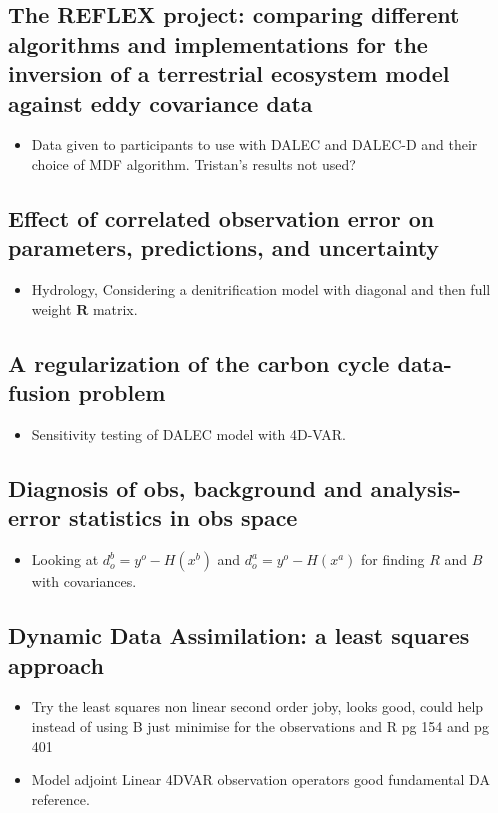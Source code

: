 \documentclass[11pt]{article}
\begin{document}
\subsection*{The REFLEX project: comparing different algorithms and implementations for the inversion of a terrestrial ecosystem model against eddy covariance data \cite{fox2009reflex}}
\begin{itemize}
\item Data given to participants to use with DALEC and DALEC-D and their choice of MDF algorithm. Tristan's results not used?
\end{itemize}


\subsection*{Effect of correlated observation error on parameters, predictions, and uncertainty \cite{tiedeman2013effect}}
\begin{itemize}
\item Hydrology, Considering a denitrification model with diagonal and then full weight $\textbf{R}$ matrix.
\end{itemize}


\subsection*{A regularization of the carbon cycle data-fusion problem \cite{delahaies2013regularization}}
\begin{itemize}
\item Sensitivity testing of DALEC model with 4D-VAR. 
\end{itemize}


\subsection*{Diagnosis of obs, background and analysis-error statistics in obs space \cite{desroziers2005diagnosis}}
\begin{itemize}
\item Looking at $d_o^b = y^o-H(x^b)$ and $d_o^a = y^o-H(x^a)$ for finding $R$ and $B$ with covariances.
\end{itemize}


\subsection*{Dynamic Data Assimilation: a least squares approach \cite{lewis2006dynamic}}
\begin{itemize}
\item Try the least squares non linear second order joby, looks good, could help instead of using B just minimise for the observations and R pg 154 and pg 401
\item Model adjoint Linear 4DVAR observation operators good fundamental DA reference.
\end{itemize}
\end{document}
